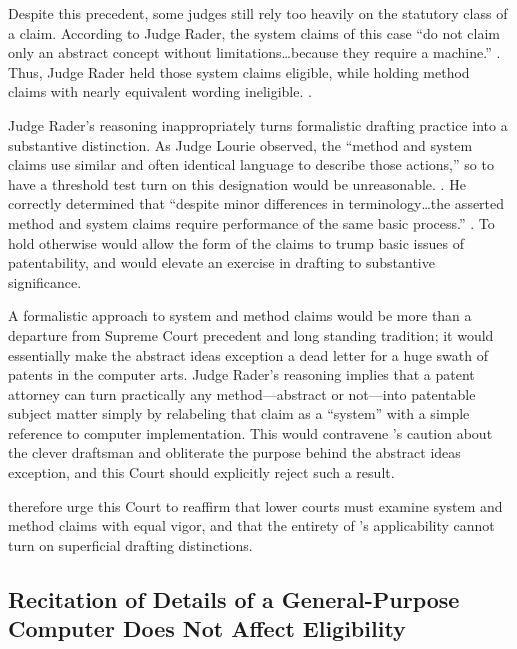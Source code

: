 \documentclass{scotus}
\begin{document}
Despite this precedent, some judges still rely too heavily on
the statutory class of a claim.  According to Judge Rader,
the system claims of this case “do not claim only an abstract concept without
limitations\ldots because they require a machine.” . Thus, Judge Rader held those system claims eligible, while holding
method claims with nearly equivalent wording ineligible. .

Judge Rader’s reasoning inappropriately turns formalistic drafting practice into
a substantive distinction.  As Judge Lourie observed, the “method and system
claims use similar and often identical language to describe those actions,” so
to have a threshold test turn on this designation would be unreasonable.
. He correctly determined that “despite minor
differences in terminology\ldots the asserted method and system claims require
performance of the same basic process.” .  To hold
otherwise would allow the form of the claims to trump basic issues of
patentability, and would elevate an exercise in drafting to substantive
significance.

A formalistic approach to system and method claims would be more than a
departure from Supreme Court precedent and long standing tradition; it would
essentially make the abstract ideas exception a dead letter for a huge swath of
patents in the computer arts. Judge Rader’s reasoning implies that a patent
attorney can turn practically any method---abstract or not---into patentable
subject matter simply by relabeling that claim as a “system” with a simple
reference to computer implementation.  This would contravene ’s
caution about the clever draftsman and obliterate the purpose behind the
abstract ideas exception, and this Court should explicitly reject such a result.

\Amici therefore urge this Court to reaffirm that lower courts must examine
system and method claims with equal vigor, and that the entirety of
’s applicability cannot turn on superficial drafting distinctions.  



%
%
\subsection{Recitation of Details of a General-Purpose Computer Does Not Affect
Eligibility}
\end{document}
